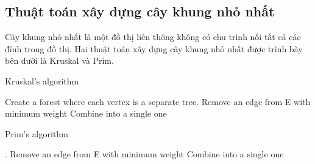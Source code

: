 \subsection{Thuật toán xây dựng cây khung nhỏ nhất}
Cây khung nhỏ nhất là một đồ thị liên thông không có chu trình nối tất cả các đỉnh trong đồ thị. Hai thuật toán xây dựng cây khung nhỏ nhất được trình bày bên dưới là Kruskal và Prim.
\linebreak
\linebreak 
\begin{algorithm}
\renewcommand{\thealgorithm}{}
\caption{Kruskal's algorithm}\label{euclid}
\begin{algorithmic}[1]
	\State Create a forest where each vertex is a separate tree.
		\State Remove an edge from E with minimum weight
			\State Combine into a single one		
		\EndIf	
	\EndWhile 
\EndProcedure
\end{algorithmic}
\end{algorithm}

\begin{algorithm}
\renewcommand{\thealgorithm}{}
\caption{Prim's algorithm}\label{euclid}
\begin{algorithmic}[1]
	\State .
		\State Remove an edge from E with minimum weight
			\State Combine into a single one		
		\EndIf	
	\EndWhile 
\EndProcedure
\end{algorithmic}
\end{algorithm}

